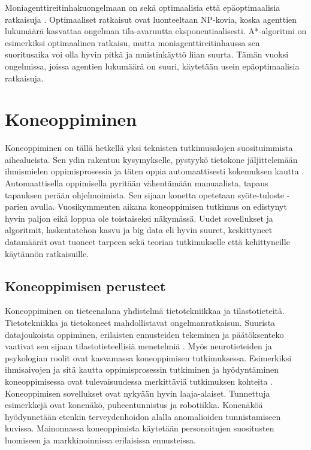 \documentclass[utf8]{gradu3}
\begin{document}
Moniagenttireitinhakuongelmaan on sekä optimaalisia että epäoptimaalisia ratkaisuja \parencite{sharon2015conflict}. Optimaaliset ratkaisut ovat luonteeltaan NP-kovia, koska agenttien lukumäärä kasvattaa ongelman tila-avaruutta eksponentiaalisesti. A*-algoritmi on esimerkiksi optimaalinen ratkaisu, mutta moniagenttireitinhaussa sen suoritusaika voi olla hyvin pitkä ja muistinkäyttö liian suurta. Tämän vuoksi ongelmissa, joissa agentien lukumäärä on suuri, käytetään usein epäoptimaalisia ratkaisuja.

\chapter{Koneoppiminen}
\label{koneoppiminen}

Koneoppiminen on tällä hetkellä yksi teknisten tutkimusalojen suosituimmista aihealueista. Sen ydin rakentuu kysymykselle, pystyykö tietokone jäljittelemään ihmismielen oppimisprosessia ja täten oppia automaattisesti kokemuksen kautta \parencite{das2017survey,jordan2015machine}. Automaattisella oppimisella pyritään vähentämään manuaalista, tapaus tapauksen perään ohjelmoimista. Sen sijaan konetta opetetaan syöte-tuloste -parien avulla. Vuosikymmenten aikana koneoppimisen tutkimus on edistynyt hyvin paljon eikä loppua ole toistaiseksi näkymässä. Uudet sovellukset ja algoritmit, laskentatehon kasvu ja big data eli hyvin suuret, keskittyneet datamäärät ovat tuoneet tarpeen sekä teorian tutkimukselle että kehittyneille käytännön ratkaisuille.

\section{Koneoppimisen perusteet}

Koneoppiminen on tieteenalana yhdistelmä tietotekniikkaa ja tilastotieteitä. Tietotekniikka ja tietokoneet mahdollistavat ongelmanratkaisun. Suurista datajoukoista oppiminen, erilaisten ennusteiden tekeminen ja päätöksenteko vaativat sen sijaan tilastotieteellisiä menetelmiä \parencite{das2017survey,jordan2015machine}. Myös neurotieteiden ja psykologian roolit ovat kasvamassa koneoppimisen tutkimuksessa. Esimerkiksi ihmisaivojen ja sitä kautta oppimisprosessin tutkiminen ja hyödyntäminen koneoppimisessa ovat tulevaisuudessa merkittäviä tutkimuksen kohteita \parencite{das2017survey}. Koneoppimisen sovellukset ovat nykyään hyvin laaja-alaiset. Tunnettuja esimerkkejä ovat konenäkö, puheentunnistus ja robotiikka. Konenäköä hyödynnetään etenkin terveydenhoidon alalla anomalioiden tunnistamiseen kuvissa. Mainonnassa koneoppimista käytetään personoitujen suositusten luomiseen ja markkinoinnissa erilaisissa ennusteissa.
\end{document}
